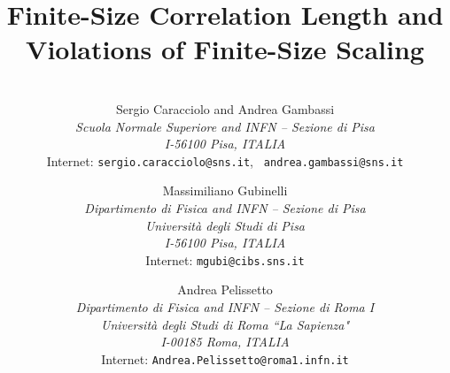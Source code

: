 \documentclass[12pt]{article}
\begin{document}
\makeatletter
{}
\renewcommand{\theequation}{\thesection.\arabic{equation}}
\makeatother

\title{Finite-Size Correlation Length and Violations of Finite-Size 
Scaling
}

\author{
  \\
  { Sergio Caracciolo and Andrea Gambassi }              \\
  {\small\it Scuola Normale Superiore and INFN -- Sezione di Pisa}  \\[-0.2cm]
  {\small\it I-56100 Pisa, ITALIA}          \\[-0.2cm]
  {\small Internet: {\tt sergio.caracciolo@sns.it}, {\tt
  andrea.gambassi@sns.it}  }    
  \\[-0.1cm]  \and
  { Massimiliano Gubinelli}              \\
  {\small\it Dipartimento di Fisica and INFN -- Sezione di Pisa}    \\[-0.2cm]
  {\small\it Universit\`a degli Studi di Pisa}        \\[-0.2cm]
  {\small\it I-56100 Pisa, ITALIA}          \\[-0.2cm]
  {\small Internet: {\tt mgubi@cibs.sns.it}}   
  \\[-0.1cm]  \and
  { Andrea Pelissetto}              \\
  {\small\it Dipartimento di Fisica and INFN -- Sezione di Roma I}
  \\[-0.2cm] 
  {\small\it Universit\`a degli Studi di Roma ``La Sapienza"}        \\[-0.2cm]
  {\small\it I-00185 Roma, ITALIA}          \\[-0.2cm]
  {\small Internet: {\tt Andrea.Pelissetto@roma1.infn.it}}   \\[-0.2cm]
  {\protect\makebox[5in]{\quad}}  %
  \\
}
\end{document}
